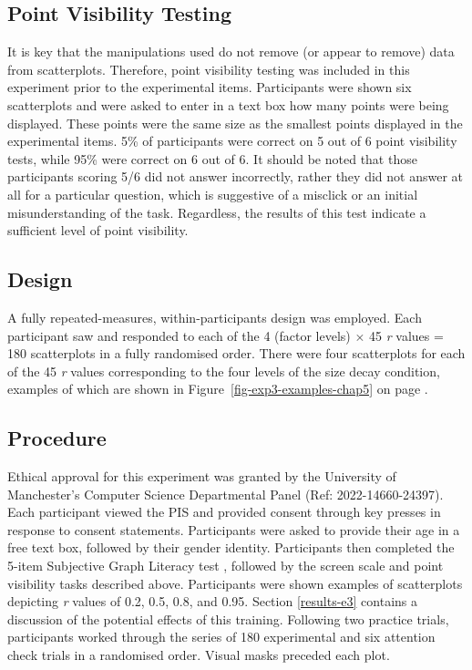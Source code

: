 \documentclass[../main.tex]{subfiles}
\begin{document}
\subsection{Point Visibility Testing}\label{point-visibility-testing-e3}

It is key that the manipulations used do not remove (or appear to
remove) data from scatterplots. Therefore, point visibility testing was
included in this experiment prior to the experimental items.
Participants were shown six scatterplots and were asked to enter in a
text box how many points were being displayed. These points were the
same size as the smallest points displayed in the experimental items.
5\% of participants were correct on 5 out of 6 point visibility tests,
while 95\% were correct on 6 out of 6. It should be noted that those
participants scoring 5/6 did not answer incorrectly, rather they did not
answer at all for a particular question, which is suggestive of a
misclick or an initial misunderstanding of the task. Regardless, the
results of this test indicate a sufficient level of point visibility.

\subsection{Design}\label{design-e3}

A fully repeated-measures, within-participants design was employed. Each
participant saw and responded to each of the 4 (factor levels)
\(\times\) 45 \emph{r} values = 180 scatterplots in a fully randomised
order. There were four scatterplots for each of the 45 \emph{r} values
corresponding to the four levels of the size decay condition, examples
of which are shown in Figure~\ref{fig-exp3-examples-chap5} on page
\pageref{fig-exp3-examples-chap5}.

\subsection{Procedure}\label{procedure-e3}

Ethical approval for this experiment was granted by the University of
Manchester's Computer Science Departmental Panel (Ref:
2022-14660-24397). Each participant viewed the PIS and provided consent
through key presses in response to consent statements. Participants were
asked to provide their age in a free text box, followed by their gender
identity. Participants then completed the 5-item Subjective Graph
Literacy test \cite{garcia_2016}, followed by the screen scale and point
visibility tasks described above. Participants were shown examples of
scatterplots depicting \emph{r} values of 0.2, 0.5, 0.8, and 0.95.
Section \ref{results-e3} contains a discussion of the potential effects
of this training. Following two practice trials, participants worked
through the series of 180 experimental and six attention check trials in
a randomised order. Visual masks preceded each plot.
\end{document}
